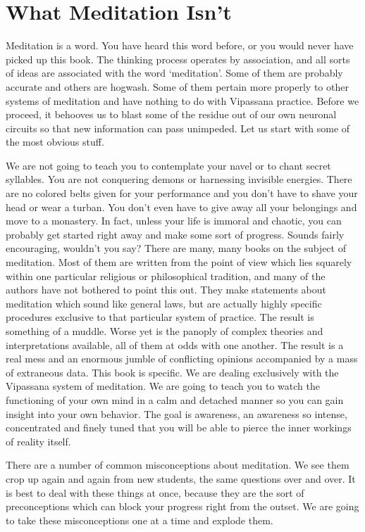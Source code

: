 \chapter{What Meditation Isn't}

Meditation is a word. You have heard this word before, or you would never have
picked up this book. The thinking process operates by association, and all sorts
of ideas are associated with the word `meditation'. Some of them are probably
accurate and others are hogwash. Some of them pertain more properly to other
systems of meditation and have nothing to do with Vipassana practice. Before we
proceed, it behooves us to blast some of the residue out of our own neuronal
circuits so that new information can pass unimpeded. Let us start with some of
the most obvious stuff.

We are not going to teach you to contemplate your navel or to chant secret
syllables. You are not conquering demons or harnessing invisible energies. There
are no colored belts given for your performance and you don't have to shave your
head or wear a turban. You don't even have to give away all your belongings and
move to a monastery. In fact, unless your life is immoral and chaotic, you can
probably get started right away and make some sort of progress. Sounds fairly
encouraging, wouldn't you say?  There are many, many books on the subject of
meditation. Most of them are written from the point of view which lies squarely
within one particular religious or philosophical tradition, and many of the
authors have not bothered to point this out. They make statements about
meditation which sound like general laws, but are actually highly specific
procedures exclusive to that particular system of practice. The result is
something of a muddle. Worse yet is the panoply of complex theories and
interpretations available, all of them at odds with one another. The result is a
real mess and an enormous jumble of conflicting opinions accompanied by a mass
of extraneous data. This book is specific. We are dealing exclusively with the
Vipassana system of meditation. We are going to teach you to watch the
functioning of your own mind in a calm and detached manner so you can gain
insight into your own behavior. The goal is awareness, an awareness so intense,
concentrated and finely tuned that you will be able to pierce the inner workings
of reality itself.

There are a number of common misconceptions about meditation. We see them crop
up again and again from new students, the same questions over and over. It is
best to deal with these things at once, because they are the sort of
preconceptions which can block your progress right from the outset. We are going
to take these misconceptions one at a time and explode them.

